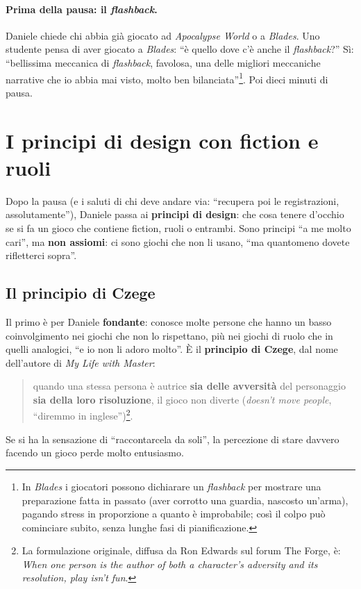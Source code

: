 \paragraph{Prima della pausa: il \emph{flashback}.} Daniele chiede chi abbia già giocato ad
\emph{Apocalypse World} o a \emph{Blades}. Uno studente pensa di aver giocato a \emph{Blades}:
``è quello dove c'è anche il \emph{flashback}?'' Sì: ``bellissima meccanica di \emph{flashback},
favolosa, una delle migliori meccaniche narrative che io abbia mai visto, molto ben
bilanciata''\footnote{In \emph{Blades} i giocatori possono dichiarare un \emph{flashback} per
mostrare una preparazione fatta in passato (aver corrotto una guardia, nascosto un'arma),
pagando stress in proporzione a quanto è improbabile; così il colpo può cominciare subito, senza
lunghe fasi di pianificazione.}. Poi dieci minuti di pausa.

\section{I principi di design con fiction e ruoli}
\label{a16:sec:principi}

Dopo la pausa (e i saluti di chi deve andare via: ``recupera poi le registrazioni,
assolutamente''), Daniele passa ai \textbf{principi di design}: che cosa tenere d'occhio se si fa
un gioco che contiene fiction, ruoli o entrambi. Sono principi ``a me molto cari'', ma \textbf{non
assiomi}: ci sono giochi che non li usano, ``ma quantomeno dovete rifletterci sopra''.

\subsection{Il principio di Czege}



Il primo è per Daniele \textbf{fondante}: conosce molte persone che hanno un basso coinvolgimento
nei giochi che non lo rispettano, più nei giochi di ruolo che in quelli analogici, ``e io non li
adoro molto''. È il \textbf{principio di Czege}, dal nome dell'autore di \emph{My Life with Master}:
\begin{quote}
quando una stessa persona è autrice \textbf{sia delle avversità} del personaggio \textbf{sia della
loro risoluzione}, il gioco non diverte (\emph{doesn't move people}, ``diremmo in
inglese'')\footnote{La formulazione originale, diffusa da Ron Edwards sul forum The Forge, è:
\emph{When one person is the author of both a character's adversity and its resolution, play
isn't fun}.}.
\end{quote}
Se si ha la sensazione di ``raccontarcela da soli'', la percezione di stare davvero facendo un
gioco perde molto entusiasmo.

